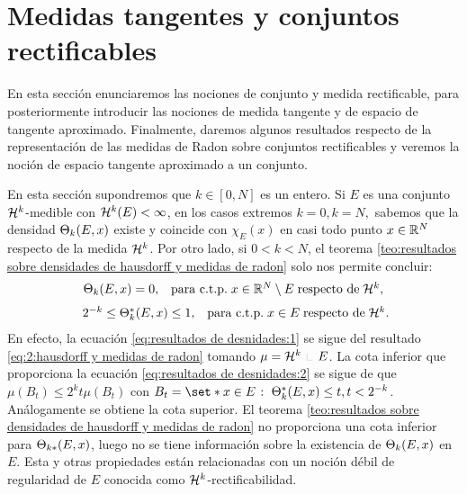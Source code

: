 \documentclass[a4paper,11pt,spanish, twoside, leqno]{tfm-uam}
\begin{document}
\section{Medidas tangentes y conjuntos rectificables}

En esta sección enunciaremos las nociones de conjunto y medida rectificable, para posteriormente introducir las nociones de medida tangente y de espacio de tangente aproximado. Finalmente, daremos algunos resultados respecto de la representación de las medidas de Radon sobre conjuntos rectificables y veremos la noción de espacio tangente aproximado a un conjunto.

En esta sección supondremos que $k\in[0,N]$ es un entero. Si $E$ es una conjunto $\mathcal{H}^{k}$-medible con $\mathcal{H}^{k}(E)<\infty$, en los casos extremos $k=0, k=N,$ sabemos que la densidad $\Theta_{k}(E,x)$ existe y coincide con $\chi_{E}(x)$ en casi todo punto $x\in \mathbb{R}^{N}$ respecto de la medida $\mathcal{H}^{k}$. Por otro lado, si $0<k<N$, el teorema \ref{teo:resultados sobre densidades de hausdorff y medidas de radon} solo nos permite concluir:
\begin{align}\label{eq:resultados de desnidades:1}
\begin{array}{ll}
\Theta_{k}(E,x)=0, & \text{para c.t.p.}\;x\in \mathbb{R}^{N}\setminus E\; \text{respecto de}\;\mathcal{H}^{k},
\end{array}
\end{align}
\begin{align}\label{eq:resultados de desnidades:2}
\begin{array}{ll}
\ 2^{-k}\leq \Theta_{k}^{*}(E,x)\leq 1, & \text{para c.t.p.}\;x\in E\; \text{respecto de}\;\mathcal{H}^{k}.
\end{array}
\end{align}
En efecto, la ecuación \ref{eq:resultados de desnidades:1} se sigue del resultado \ref{eq:2:hausdorff y medidas de radon} tomando $\mu=\Hm{k}\Radot E$. La cota inferior que proporciona la ecuación \ref{eq:resultados de desnidades:2} se sigue de que $\mu(B_{t})\leq 2^{k}t\mu(B_{t})$ con $B_{t}=\set*{x\in E\given \udens{k}{E}{x}\leq t}, t<2^{-k}$. Análogamente se obtiene la cota superior. El teorema \ref{teo:resultados sobre densidades de hausdorff y medidas de radon} no proporciona una cota inferior para $\Theta_{k *}(E,x)$, luego no se tiene información sobre la existencia de $\Theta_{k}(E,x)$ en $E$. Esta y otras propiedades están relacionadas con un noción débil de regularidad de $E$ conocida como $\mathcal{H}^{k}$-rectificabilidad.
\end{document}
